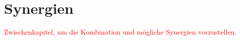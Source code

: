 \section{Synergien}
\textcolor{red}{Zwischenkapitel, um die Kombination und mögliche Synergien vorzustellen.}
